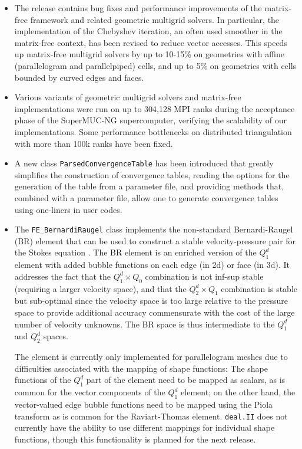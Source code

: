 \documentclass{ansarticle-preprint}
\newcommand{\specialword}[1]{\texttt{#1}}
\newcommand{\dealii}{{\specialword{deal.II}}\xspace}
\begin{document}
\begin{itemize}
\item
  The release contains bug fixes and performance improvements of the
  matrix-free framework and related geometric multigrid solvers. In
  particular, the implementation of the Chebyshev iteration, an often used
  smoother in the matrix-free context, has been revised to reduce vector
  accesses. This speeds up matrix-free multigrid solvers by up to 10-15\%
  on geometries with affine (parallelogram and parallelpiped) cells, and up
  to 5\% on geometries with cells bounded by curved edges and faces.

\item
  Various variants of geometric multigrid solvers and matrix-free
  implementations were run on up to 304,128 MPI ranks during the acceptance
  phase of the SuperMUC-NG supercomputer, verifying the scalability of our
  implementations. Some performance bottlenecks on distributed
  triangulation with more than 100k ranks have been fixed.

\item A new class \texttt{ParsedConvergenceTable} has been introduced
  that greatly simplifies the construction of convergence tables,
  reading the options for the generation of the table from a parameter
  file, and providing methods that, combined with a parameter file,
  allow one to generate convergence tables using one-liners in user
  codes.

\item
  The \texttt{FE\_BernardiRaugel} class implements the non-standard
  Bernardi-Raugel (BR) element that can be used to construct a stable
  velocity-pressure pair for the Stokes equation \cite{BR85}. The BR
  element is an enriched version of the $Q_1^d$ element with added bubble
  functions on each edge (in 2d) or face (in 3d). It addresses the fact
  that the $Q_1^d\times Q_0$ combination is not inf-sup stable (requiring a
  larger velocity space), and that the $Q_2^d\times Q_1$ combination is
  stable but sub-optimal since the velocity space is too large relative to
  the pressure space to provide additional accuracy commensurate with the
  cost of the large number of velocity unknowns. The BR space is
  thus intermediate to the $Q_1^d$ and $Q_2^d$ spaces.

  The element is currently only implemented for parallelogram meshes due to
  difficulties associated with the mapping of shape functions: The shape
  functions of the $Q_1^d$ part of the element need to be mapped as
  scalars, as is common for the vector components of the $Q_1^d$ element;
  on the other hand, the vector-valued edge bubble functions need to be
  mapped using the Piola transform as is common for the Raviart-Thomas
  element. \dealii{} does not currently have the ability to use different
  mappings for individual shape functions, though this functionality is
  planned for the next release.


\end{itemize}
\end{document}
